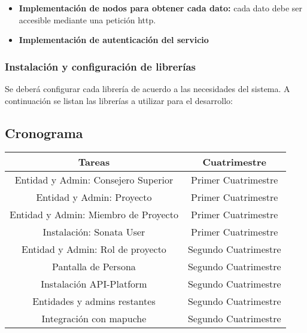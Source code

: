 \begin{itemize}
    \item \textbf{Implementación de nodos para obtener cada dato:} cada dato debe ser accesible mediante una petición http.
    \item \textbf{Implementación de autenticación del servicio}
\end{itemize}

\subsubsection{Instalación y configuración de librerías}%
\label{ssub:instalación_y_configuración_de_librerias}
Se deberá configurar cada librería de acuerdo a las necesidades del sistema.
A continuación se listan las librerías a utilizar para el desarrollo:

\begin{itemize}
    
\end{itemize}

\newpage
\subsection{Cronograma}
\label{sub:cronograma}

\begin{center}

    \begin{tabular}{| c c |}
        \hline
        Tareas & Cuatrimestre \\
        \hline
        Entidad y Admin: Consejero Superior & Primer Cuatrimestre \\
        \hline
        Entidad y Admin: Proyecto & Primer Cuatrimestre \\
        \hline
        Entidad y Admin: Miembro de Proyecto & Primer Cuatrimestre \\
        \hline
        Instalación: Sonata User & Primer Cuatrimestre  \\
        \hline
        Entidad y Admin: Rol de proyecto & Segundo Cuatrimestre \\
        \hline
        Pantalla de Persona & Segundo Cuatrimestre \\
        \hline
        Instalación API-Platform & Segundo Cuatrimestre \\
        \hline
        Entidades y admins restantes & Segundo Cuatrimestre \\
        \hline
        Integración con mapuche & Segundo Cuatrimestre \\
        \hline


    \end{tabular}


\end{center}

